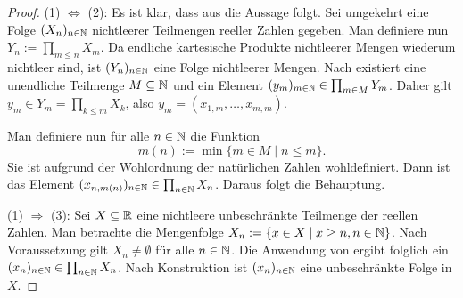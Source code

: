 \begin{proof}
  (1) $\Leftrightarrow$ (2):
  Es ist klar, dass aus \CCR die Aussage \PCCR folgt.
  Sei umgekehrt eine Folge $(X_n)_{n \in \mathbb{N}}$ nichtleerer Teilmengen reeller Zahlen gegeben.
  Man definiere nun $Y_n := \prod_{m \leq n} X_m$.
  Da endliche kartesische Produkte nichtleerer Mengen wiederum nichtleer sind, ist $(Y_n)_{n \in \mathbb{N}}$ eine Folge nichtleerer Mengen.
  Nach \PCCR existiert eine unendliche Teilmenge $M \subseteq \mathbb{N}$ und ein Element $(y_m)_{m \in \mathbb{N}} \in \prod_{m \in M} Y_m$.
  Daher gilt $y_m \in Y_m = \prod_{k \leq m} X_k$, also $y_m = (x_{1,m},\dots,x_{m,m})$.

  Man definiere nun für alle $n \in \mathbb{N}$ die Funktion
  \begin{displaymath}
    m(n) := \min\{m \in M \mid n \leq m\}.
  \end{displaymath}
  Sie ist aufgrund der Wohlordnung der natürlichen Zahlen wohldefiniert.
  Dann ist das Element $(x_{n,m(n)})_{n \in \mathbb{N}} \in \prod_{n \in \mathbb{N}} X_n$.
  Daraus folgt die Behauptung.

  (1) $\Rightarrow$ (3):
  Sei $X \subseteq \mathbb{R}$ eine nichtleere unbeschränkte Teilmenge der reellen Zahlen.
  Man betrachte die Mengenfolge $X_n := \{x \in X \mid x \geq n, n \in \mathbb{N}\}$.
  Nach Voraussetzung gilt $X_n \neq \emptyset$ für alle $n \in \mathbb{N}$.
  Die Anwendung von \CCR ergibt folglich ein $(x_n)_{n \in \mathbb{N}} \in \prod_{n \in \mathbb{N}} X_n$.
  Nach Konstruktion ist $(x_n)_{n \in \mathbb{N}}$ eine unbeschränkte Folge in $X$.


\end{proof}
